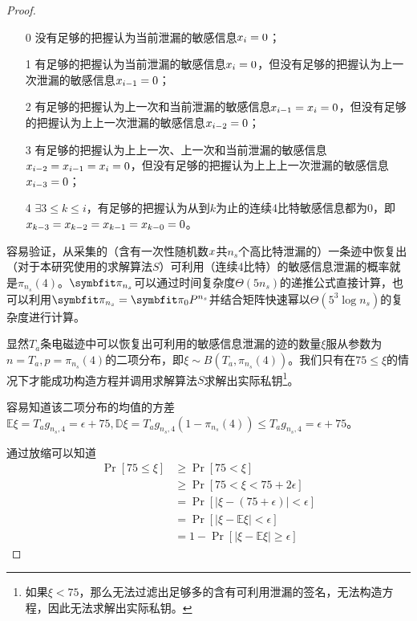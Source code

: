 {\begin{proof}
	\begin{enumerate}
		\item [0] 没有足够的把握认为当前泄漏的敏感信息$x_i=0$；
		\item [1] 有足够的把握认为当前泄漏的敏感信息$x_i=0$，但没有足够的把握认为上一次泄漏的敏感信息$x_{i-1}=0$；
		\item [2] 有足够的把握认为上一次和当前泄漏的敏感信息$x_{i-1}=x_i=0$，但没有足够的把握认为上上一次泄漏的敏感信息$x_{i-2}=0$；
		\item [3] 有足够的把握认为上上一次、上一次和当前泄漏的敏感信息$x_{i-2}=x_{i-1}=x_i=0$，但没有足够的把握认为上上上一次泄漏的敏感信息$x_{i-3}=0$；
		\item [4] $\exists 3\le k\le i$，有足够的把握认为从到$k$为止的连续4比特敏感信息都为0，即$x_{k-3}=x_{k-2}=x_{k-1}=x_{k-0}=0$。
	\end{enumerate}

	容易验证，从采集的（含有一次性随机数$x$共$n_s$个高比特泄漏的）一条迹中恢复出（对于本研究使用的求解算法$S$）可利用（连续4比特）的敏感信息泄漏的概率就是$\pi_{n_s}(4)$。$\Vector \pi_{n_s}$可以通过时间复杂度$\Theta(5n_s)$的递推公式直接计算，也可以利用$\Vector \pi_{n_s}=\Vector \pi_0 P^{n_s}$并结合矩阵快速幂以$\Theta(5^3\log n_s)$的复杂度进行计算。
		
	
	显然$T_a$条电磁迹中可以恢复出可利用的敏感信息泄漏的迹的数量$\xi$服从参数为$n=T_a,p=\pi_{n_s}(4)$的二项分布，即$\xi\sim B(T_a,\pi_{n_s}(4))$。我们只有在$75\le\xi$的情况下才能成功构造方程并调用求解算法$S$求解出实际私钥\footnote{如果$\xi<75$，那么无法过滤出足够多的含有可利用泄漏的签名，无法构造方程，因此无法求解出实际私钥。}。
	
	容易知道该二项分布的均值的方差$\mathbb E\xi=T_ag_{n_s,4}=\epsilon+75,\mathbb D\xi=T_ag_{n_s,4}(1-\pi_{n_s}(4))\le T_ag_{n_s,4}=\epsilon+75$。
	
	通过放缩可以知道\begin{align*}
		\Pr\left[75\le\xi\right]&\ge\Pr\left[75<\xi\right]\\
		&\ge\Pr\left[75<\xi<75+2\epsilon\right]\\
		&=\Pr\left[\vert \xi-(75+\epsilon)\vert<\epsilon\right]\\
		&=\Pr\left[\vert \xi-\mathbb E\xi\vert<\epsilon\right]\\
		&=1-\Pr\left[\vert \xi-\mathbb E\xi\vert\ge\epsilon\right]
	\end{align*}
	

\end{proof}}

